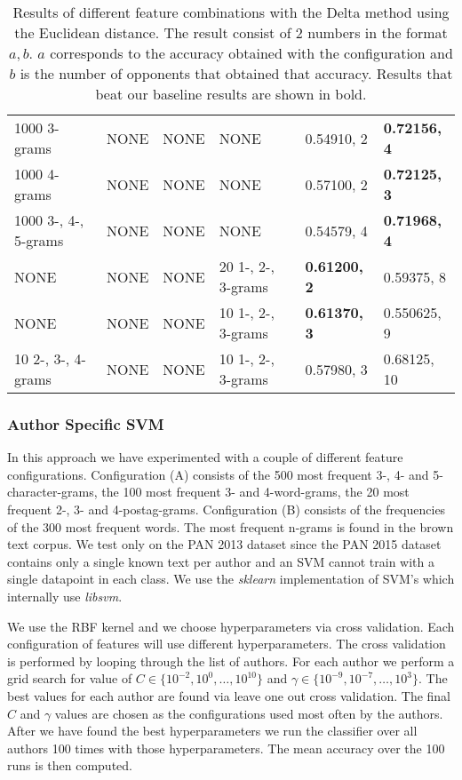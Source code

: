 \begin{landscape}
\begin{table}
\begin{tabular}{llll|ll}
        1000 3-grams & NONE & NONE & NONE & 0.54910, 2 & \textbf{0.72156, 4} \\
        1000 4-grams & NONE & NONE & NONE & 0.57100, 2 & \textbf{0.72125, 3} \\
        1000 3-, 4-, 5-grams & NONE & NONE & NONE & 0.54579, 4 &
        \textbf{0.71968, 4} \\
        NONE & NONE & NONE & 20 1-, 2-, 3-grams & \textbf{0.61200, 2} &
        0.59375, 8 \\
        NONE & NONE & NONE & 10 1-, 2-, 3-grams & \textbf{0.61370, 3} &
        0.550625, 9 \\
        10 2-, 3-, 4-grams & NONE & NONE & 10 1-, 2-, 3-grams & 0.57980, 3 &
        0.68125, 10
    \end{tabular}
    \caption{Results of different feature combinations with the Delta method
    using the Euclidean distance.  The result consist of 2 numbers in the format
    $a, b$. $a$ corresponds to the accuracy obtained with the configuration and
    $b$ is the number of opponents that obtained that accuracy. Results that
    beat our baseline results are shown in bold.}
    \label{fig:extended_delta_method_euclidean_result}
\end{table}
\end{landscape}

\subsubsection{Author Specific SVM} \label{subsubsec:method:author_specific_svm}
In this approach we have experimented with a couple of different feature
configurations. Configuration (A) consists of the 500 most frequent 3-, 4-
and 5-character-grams, the 100 most frequent 3- and 4-word-grams, the 20
most frequent 2-, 3- and 4-postag-grams. Configuration (B) consists of the
frequencies of the 300 most frequent words. The most frequent n-grams is found
in the brown text corpus. We test only on the PAN 2013 dataset since the PAN
2015 dataset contains only a single known text per author and an SVM cannot
train with a single datapoint in each class. We use the \textit{sklearn}
implementation of \gls{SVM}'s which internally use \textit{libsvm}.

We use the RBF kernel and we choose hyperparameters via cross validation.
Each configuration of features will use different hyperparameters. The cross
validation is performed by looping through the list of authors. For each
author we perform a grid search for value of $C \in \{10^{-2}, 10^{0}, \dots,
10^{10}\}$ and $\gamma \in \{10^{-9}, 10^{-7}, \dots, 10^{3}\}$. The best values
for each author are found via leave one out cross validation. The final $C$ and
$\gamma$ values are chosen as the configurations used most often by the authors.
After we have found the best hyperparameters we run the classifier over all
authors 100 times with those hyperparameters. The mean accuracy over the 100
runs is then computed.


